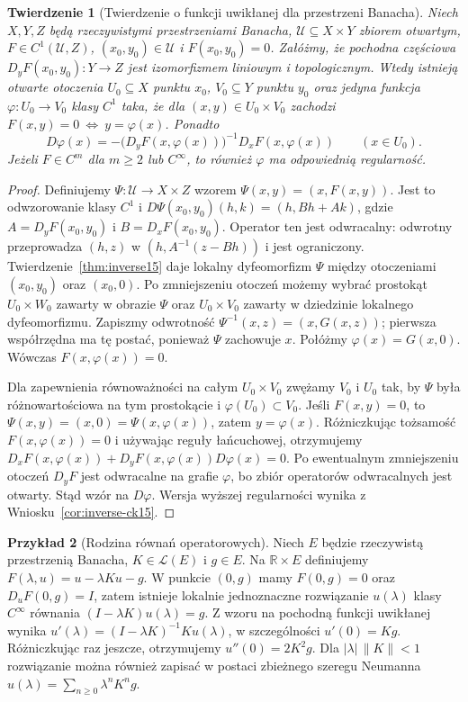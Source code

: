 \documentclass[11pt,a4paper]{article}
\numberwithin{equation}{section}
\theoremstyle{plain}
\newtheorem{twierdzenie}{Twierdzenie}[section]
\theoremstyle{definition}
\newtheorem{przyklad}[twierdzenie]{Przykład}
\theoremstyle{remark}
\newcommand{\R}{\mathbb R}
\begin{document}
\begin{twierdzenie}[Twierdzenie o funkcji uwikłanej dla przestrzeni Banacha]
\label{thm:implicit15}
Niech $X,Y,Z$ będą rzeczywistymi przestrzeniami Banacha, $\mathcal U\subseteq X\times Y$ zbiorem otwartym, $F\in C^1(\mathcal U,Z)$, $(x_0,y_0)\in\mathcal U$ i $F(x_0,y_0)=0$. Załóżmy, że pochodna częściowa $D_yF(x_0,y_0):Y\to Z$ jest izomorfizmem liniowym i topologicznym. Wtedy istnieją otwarte otoczenia $U_0\subseteq X$ punktu $x_0$, $V_0\subseteq Y$ punktu $y_0$ oraz jedyna funkcja $\varphi:U_0\to V_0$ klasy $C^1$ taka, że dla $(x,y)\in U_0\times V_0$ zachodzi
$F(x,y)=0\ \Longleftrightarrow\ y=\varphi(x)$. Ponadto
\[
D\varphi(x)=-\bigl(D_yF(x,\varphi(x))\bigr)^{-1}D_xF(x,\varphi(x))\qquad(x\in U_0).
\]
Jeżeli $F\in C^m$ dla $m\ge2$ lub $C^\infty$, to również $\varphi$ ma odpowiednią regularność.
\end{twierdzenie}
\begin{proof}
Definiujemy $\Psi:\mathcal U\to X\times Z$ wzorem $\Psi(x,y)=(x,F(x,y))$. Jest to odwzorowanie klasy $C^1$ i
$D\Psi(x_0,y_0)(h,k)=(h,Bh+Ak)$, gdzie $A=D_yF(x_0,y_0)$ i $B=D_xF(x_0,y_0)$. Operator ten jest odwracalny: odwrotny przeprowadza $(h,z)$ w $(h,A^{-1}(z-Bh))$ i jest ograniczony. Twierdzenie~\ref{thm:inverse15} daje lokalny dyfeomorfizm $\Psi$ między otoczeniami $(x_0,y_0)$ oraz $(x_0,0)$. Po zmniejszeniu otoczeń możemy wybrać prostokąt $U_0\times W_0$ zawarty w obrazie $\Psi$ oraz $U_0\times V_0$ zawarty w dziedzinie lokalnego dyfeomorfizmu. Zapiszmy odwrotność $\Psi^{-1}(x,z)=(x,G(x,z))$; pierwsza współrzędna ma tę postać, ponieważ $\Psi$ zachowuje $x$. Połóżmy $\varphi(x)=G(x,0)$. Wówczas $F(x,\varphi(x))=0$.

Dla zapewnienia równoważności na całym $U_0\times V_0$ zwężamy $V_0$ i $U_0$ tak, by $\Psi$ była różnowartościowa na tym prostokącie i $\varphi(U_0)\subset V_0$. Jeśli $F(x,y)=0$, to $\Psi(x,y)=(x,0)=\Psi(x,\varphi(x))$, zatem $y=\varphi(x)$. Różniczkując tożsamość $F(x,\varphi(x))=0$ i używając reguły łańcuchowej, otrzymujemy
$D_xF(x,\varphi(x))+D_yF(x,\varphi(x))D\varphi(x)=0$.
Po ewentualnym zmniejszeniu otoczeń $D_yF$ jest odwracalne na grafie $\varphi$, bo zbiór operatorów odwracalnych jest otwarty. Stąd wzór na $D\varphi$. Wersja wyższej regularności wynika z Wniosku~\ref{cor:inverse-ck15}.
\end{proof}

\begin{przyklad}[Rodzina równań operatorowych]
\label{ex:implicit-operator15}
Niech $E$ będzie rzeczywistą przestrzenią Banacha, $K\in\mathcal L(E)$ i $g\in E$. Na $\R\times E$ definiujemy $F(\lambda,u)=u-\lambda Ku-g$. W punkcie $(0,g)$ mamy $F(0,g)=0$ oraz $D_uF(0,g)=I$, zatem istnieje lokalnie jednoznaczne rozwiązanie $u(\lambda)$ klasy $C^\infty$ równania $(I-\lambda K)u(\lambda)=g$. Z wzoru na pochodną funkcji uwikłanej wynika
$u'(\lambda)=(I-\lambda K)^{-1}Ku(\lambda)$, w szczególności $u'(0)=Kg$. Różniczkując raz jeszcze, otrzymujemy $u''(0)=2K^2g$. Dla $|\lambda|\,\|K\|<1$ rozwiązanie można również zapisać w postaci zbieżnego szeregu Neumanna $u(\lambda)=\sum_{n\ge0}\lambda^nK^ng$.
\end{przyklad}
\end{document}
